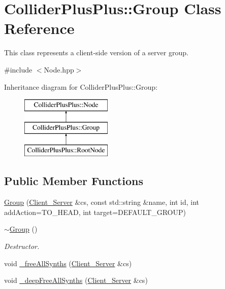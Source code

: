 \hypertarget{classColliderPlusPlus_1_1Group}{\section{Collider\-Plus\-Plus\-:\-:Group Class Reference}
\label{classColliderPlusPlus_1_1Group}
}


This class represents a client-\/side version of a server group.  




{\ttfamily \#include $<$Node.\-hpp$>$}

Inheritance diagram for Collider\-Plus\-Plus\-:\-:Group\-:\begin{figure}[H]
\begin{center}
\leavevmode
\includegraphics[height=3.000000cm]{classColliderPlusPlus_1_1Group}
\end{center}
\end{figure}
\subsection*{Public Member Functions}
\begin{DoxyCompactItemize}
\item 
\hyperlink{classColliderPlusPlus_1_1Group_ac33222e7c7705d374dba6e4d5b97acf5}{Group} (\hyperlink{classColliderPlusPlus_1_1Client__Server}{Client\-\_\-\-Server} \&cs, const std\-::string \&name, int id, int add\-Action=T\-O\-\_\-\-H\-E\-A\-D, int target=D\-E\-F\-A\-U\-L\-T\-\_\-\-G\-R\-O\-U\-P)
\item 
\hypertarget{classColliderPlusPlus_1_1Group_aed00a22ff227ee2657ae44a5cbcedf7c}{\hyperlink{classColliderPlusPlus_1_1Group_aed00a22ff227ee2657ae44a5cbcedf7c}{$\sim$\-Group} ()}\label{classColliderPlusPlus_1_1Group_aed00a22ff227ee2657ae44a5cbcedf7c}

\begin{DoxyCompactList}\small\item\em Destructor. \end{DoxyCompactList}\item 
void \hyperlink{classColliderPlusPlus_1_1Group_a343180ba103935aa4f88d1671764bf97}{\-\_\-free\-All\-Synths} (\hyperlink{classColliderPlusPlus_1_1Client__Server}{Client\-\_\-\-Server} \&cs)
\item 
void \hyperlink{classColliderPlusPlus_1_1Group_a3ed1ee8595e234c4417225d271ecab42}{\-\_\-deep\-Free\-All\-Synths} (\hyperlink{classColliderPlusPlus_1_1Client__Server}{Client\-\_\-\-Server} \&cs)
\end{DoxyCompactItemize}
